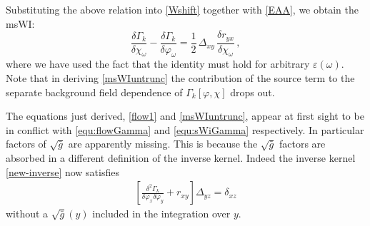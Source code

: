 \documentclass[11pt,draft]{book} %
\begin{document}
Substituting the above relation into \eqref{Wshift} together with \eqref{EAA}, we obtain the msWI:
\begin{equation}
	\label{msWIuntrunc}
	\frac{\delta \Gamma_k}{\delta\chi_\omega}-\frac{\delta \Gamma_k}{\delta\varphi_\omega}=
	\frac{1}{2} \, \Delta_{xy}\,\frac{\delta r_{yx}}{\delta\chi_\omega} \,,
\end{equation}
where we have used the fact that the identity must hold for arbitrary $\varepsilon(\omega)$.
Note that in deriving \eqref{msWIuntrunc} the contribution of the source term to the separate background
field dependence of $\Gamma_k[\varphi,\chi]$ drops out.

The equations just derived, \eqref{flow1} and \eqref{msWIuntrunc},
appear at first sight to be in conflict with \eqref{equ:flowGamma} and \eqref{equ:sWiGamma} respectively.
In particular  factors of $\sqrt{\bar g}$ are apparently missing. This is because the $\sqrt{\bar g}$ factors
are absorbed in a different definition of the inverse kernel.
Indeed the inverse kernel \eqref{new-inverse} now satisfies
\begin{align}
  \left[
    \frac{\delta^{2}\Gamma_k}{\delta\varphi_x \delta\varphi_y}+r_{xy}
  \right] \Delta_{yz} =\delta_{xz}
\end{align}
without a $\sqrt{\bar g}(y)$  included in the integration over $y$.
\end{document}
